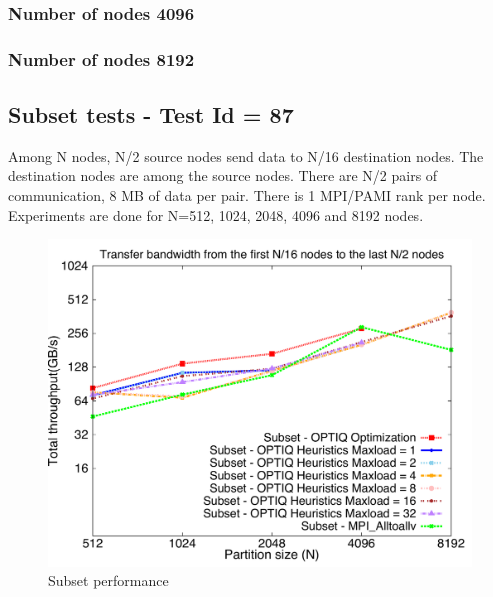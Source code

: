\documentclass[letter]{article}
\begin{document}


\newpage

\subsubsection{Number of nodes 4096}





\newpage

\subsubsection{Number of nodes 8192}



%

\newpage

\subsection{Subset tests - Test Id = 87}

Among N nodes, N/2 source nodes send data to N/16 destination nodes. The destination nodes are among the source nodes. There are N/2 pairs of communication, 8 MB of data per pair. There is 1 MPI/PAMI rank per node. Experiments are done for N=512, 1024, 2048, 4096 and 8192 nodes.

\begin{figure}[h]
\vspace{-0.1in}
\centering
\includegraphics[scale=0.50]{report_figures/constantr_87.pdf}
\vspace{-0.1in}
\caption{Subset performance}
\vspace{-0.1in}
\label{fig:patterns}
\end{figure}
\end{document}
